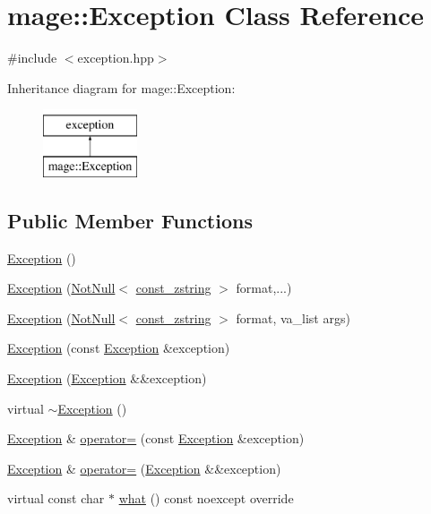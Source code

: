\hypertarget{classmage_1_1_exception}{}\section{mage\+:\+:Exception Class Reference}
\label{classmage_1_1_exception}


{\ttfamily \#include $<$exception.\+hpp$>$}

Inheritance diagram for mage\+:\+:Exception\+:\begin{figure}[H]
\begin{center}
\leavevmode
\includegraphics[height=2.000000cm]{classmage_1_1_exception}
\end{center}
\end{figure}
\subsection*{Public Member Functions}
\begin{DoxyCompactItemize}
\item 
\hyperlink{classmage_1_1_exception_a87fd5f6c5465c01244020afbaebdb9f5}{Exception} ()
\item 
\hyperlink{classmage_1_1_exception_ace796ee1ef1e8969b043cd0b3f0b23e0}{Exception} (\hyperlink{namespacemage_a8769f9d670d6b585ea306cb1062af94b}{Not\+Null}$<$ \hyperlink{namespacemage_abfd9206dc607ceb5d13ec68bf075a5c0}{const\+\_\+zstring} $>$ format,...)
\item 
\hyperlink{classmage_1_1_exception_aaae8328720d103e5726758673943b756}{Exception} (\hyperlink{namespacemage_a8769f9d670d6b585ea306cb1062af94b}{Not\+Null}$<$ \hyperlink{namespacemage_abfd9206dc607ceb5d13ec68bf075a5c0}{const\+\_\+zstring} $>$ format, va\+\_\+list args)
\item 
\hyperlink{classmage_1_1_exception_a3f8642ade2ed1168a9853a50ee0e8e98}{Exception} (const \hyperlink{classmage_1_1_exception}{Exception} \&exception)
\item 
\hyperlink{classmage_1_1_exception_a5a745eb8921cb986c822c0f95455314a}{Exception} (\hyperlink{classmage_1_1_exception}{Exception} \&\&exception)
\item 
virtual \hyperlink{classmage_1_1_exception_a088e91ba8dffd31a9d6aa7d4af2ee2c0}{$\sim$\+Exception} ()
\item 
\hyperlink{classmage_1_1_exception}{Exception} \& \hyperlink{classmage_1_1_exception_ab0e7e6b32b07505271a4a88067ab54f4}{operator=} (const \hyperlink{classmage_1_1_exception}{Exception} \&exception)
\item 
\hyperlink{classmage_1_1_exception}{Exception} \& \hyperlink{classmage_1_1_exception_aa9305c6bd8836f56ffa970473533f031}{operator=} (\hyperlink{classmage_1_1_exception}{Exception} \&\&exception)
\item 
virtual const char $\ast$ \hyperlink{classmage_1_1_exception_ae2bd4437e2b7c960f022f7d3bf79baa7}{what} () const noexcept override
\end{DoxyCompactItemize}
